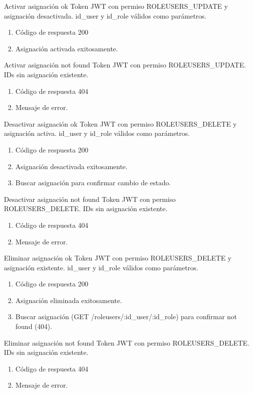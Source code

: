 {Activar asignación ok}
{Token JWT con permiso ROLEUSERS\_UPDATE y asignación desactivada.}
{id\_user y id\_role válidos como parámetros.}
{\begin{enumerate} [leftmargin=*, nosep]
    \item Código de respuesta 200
    \item Asignación activada exitosamente.
\end{enumerate}}

{Activar asignación not found}
{Token JWT con permiso ROLEUSERS\_UPDATE.}
{IDs sin asignación existente.}
{\begin{enumerate} [leftmargin=*, nosep]
    \item Código de respuesta 404
    \item Mensaje de error.
\end{enumerate}}

{Desactivar asignación ok}
{Token JWT con permiso ROLEUSERS\_DELETE y asignación activa.}
{id\_user y id\_role válidos como parámetros.}
{\begin{enumerate} [leftmargin=*, nosep]
    \item Código de respuesta 200
    \item Asignación desactivada exitosamente.
    \item Buscar asignación para confirmar cambio de estado.
\end{enumerate}}

{Desactivar asignación not found}
{Token JWT con permiso ROLEUSERS\_DELETE.}
{IDs sin asignación existente.}
{\begin{enumerate} [leftmargin=*, nosep]
    \item Código de respuesta 404
    \item Mensaje de error.
\end{enumerate}}

{Eliminar asignación ok}
{Token JWT con permiso ROLEUSERS\_DELETE y asignación existente.}
{id\_user y id\_role válidos como parámetros.}
{\begin{enumerate} [leftmargin=*, nosep]
    \item Código de respuesta 200
    \item Asignación eliminada exitosamente.
    \item Buscar asignación (GET /roleusers/:id\_user/:id\_role) para confirmar not found (404).
\end{enumerate}}

{Eliminar asignación not found}
{Token JWT con permiso ROLEUSERS\_DELETE.}
{IDs sin asignación existente.}
{\begin{enumerate} [leftmargin=*, nosep]
    \item Código de respuesta 404
    \item Mensaje de error.
\end{enumerate}}

